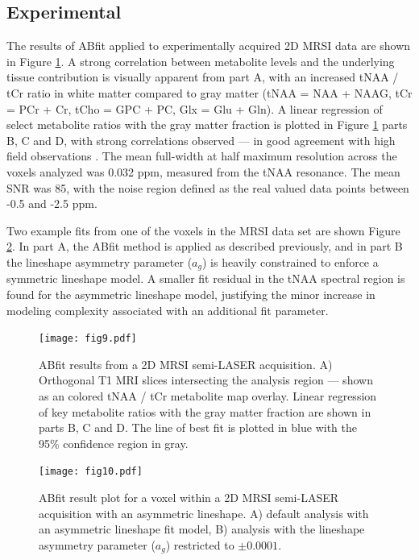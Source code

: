 \documentclass[num-refs]{wiley-article}
\begin{document}
\subsection{Experimental}
The results of ABfit applied to experimentally acquired 2D MRSI data are shown in Figure \ref{mrsi_res}. A strong correlation between metabolite levels and the underlying tissue contribution is visually apparent from part A, with an increased tNAA / tCr ratio in white matter compared to gray matter (tNAA = NAA + NAAG, tCr = PCr + Cr, tCho = GPC + PC, Glx = Glu + Gln). A linear regression of select metabolite ratios with the gray matter fraction is plotted in Figure \ref{mrsi_res} parts B, C and D, with strong correlations observed --- in good agreement with high field observations \cite{Nassirpour2018, Hangel2018}. The mean full-width at half maximum resolution across the voxels analyzed was 0.032 ppm, measured from the tNAA resonance. The mean SNR was 85, with the noise region defined as the real valued data points between -0.5 and -2.5 ppm.

Two example fits from one of the voxels in the MRSI data set are shown Figure \ref{lineshape_res}. In part A, the ABfit method is applied as described previously, and in part B the lineshape asymmetry parameter ($a_{g}$) is heavily constrained to enforce a symmetric lineshape model. A smaller fit residual in the tNAA spectral region is found for the asymmetric lineshape model, justifying the minor increase in modeling complexity associated with an additional fit parameter.

\begin{figure}
  \begin{center}
    \texttt{[image: fig9.pdf]}
    \caption{ABfit results from a 2D MRSI semi-LASER acquisition. A) Orthogonal T1 MRI slices intersecting the analysis region --- shown as an colored tNAA / tCr metabolite map overlay. Linear regression of key metabolite ratios with the gray matter fraction are shown in parts B, C and D. The line of best fit is plotted in blue with the 95\% confidence region in gray.}
    \label{mrsi_res}
  \end{center}
\end{figure}

\begin{figure}
  \begin{center}
    \texttt{[image: fig10.pdf]}
    \caption{ABfit result plot for a voxel within a 2D MRSI semi-LASER acquisition with an asymmetric lineshape. A) default analysis with an asymmetric lineshape fit model, B) analysis with the lineshape asymmetry parameter ($a_{g}$) restricted to $\pm 0.0001$.}
    \label{lineshape_res}
  \end{center}
\end{figure}
\end{document}
